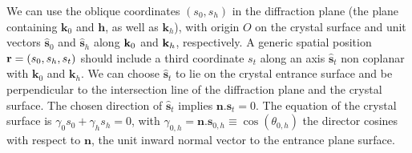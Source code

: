 \documentclass[preprint]{iucr}              %
\begin{document}
We can use the oblique coordinates $(s_0,s_h)$ in the diffraction plane (the plane containing $\textbf{k}_0$ and $\textbf{h}$, as well as $\textbf{k}_h$),
with origin $O$ on the crystal surface and unit vectors 
$\hat{ \textbf{s}}_{0}$ and $\hat{ \textbf{s}}_{h}$ along $\textbf k_0$ and $\textbf k_h$, respectively.
A generic spatial position  $\textbf r=(s_0,s_h,s_t)$ should include a third coordinate $s_t$ along an axis $\hat{\textbf{s}}_t$ non coplanar with $\textbf{k}_0$ and $\textbf{k}_h$.
We can choose $\hat{ \textbf{s}}_{t}$ to lie on the crystal entrance surface and be perpendicular to the intersection line of the diffraction plane and the crystal surface.
The chosen direction of $\hat{\textbf{s}}_{t}$ implies $
\textbf{n}.\textbf{s}_t=0$.
The equation of the crystal surface is $\gamma_0 s_0 + \gamma_h s_h =0$, with $\gamma_{0,h}=\textbf{n}.\textbf{s}_{0,h} \equiv \cos(\theta_{0,h})$ the director cosines with respect to $\textbf{n}$, the unit inward normal vector to the entrance plane surface.
\end{document}
